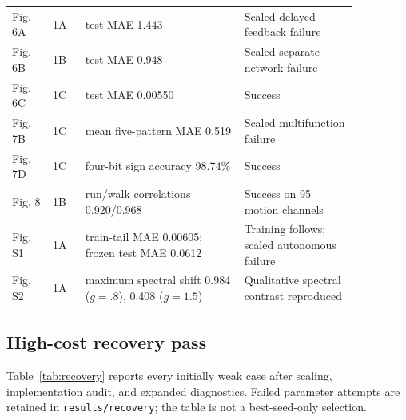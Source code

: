 {\begin{longtable}{@{}p{0.10\linewidth}p{0.08\linewidth}p{0.39\linewidth}p{0.29\linewidth}@{}}
Fig. 6A & 1A & test MAE 1.443 & Scaled delayed-feedback failure \\
Fig. 6B & 1B & test MAE 0.948 & Scaled separate-network failure \\
Fig. 6C & 1C & test MAE 0.00550 & Success \\
Fig. 7B & 1C & mean five-pattern MAE 0.519 & Scaled multifunction failure \\
Fig. 7D & 1C & four-bit sign accuracy 98.74\% & Success \\
Fig. 8 & 1B & run/walk correlations 0.920/0.968 & Success on 95 motion channels \\
Fig. S1 & 1A & train-tail MAE 0.00605; frozen test MAE 0.0612 & Training follows; scaled autonomous failure \\
Fig. S2 & 1A & maximum spectral shift 0.984 ($g=.8$), 0.408 ($g=1.5$) & Qualitative spectral contrast reproduced \\
\bottomrule
\end{longtable}
}

\subsection{High-cost recovery pass}
Table~\ref{tab:recovery} reports every initially weak case after scaling, implementation audit, and expanded diagnostics. Failed parameter attempts are retained in \texttt{results/recovery}; the table is not a best-seed-only selection.


